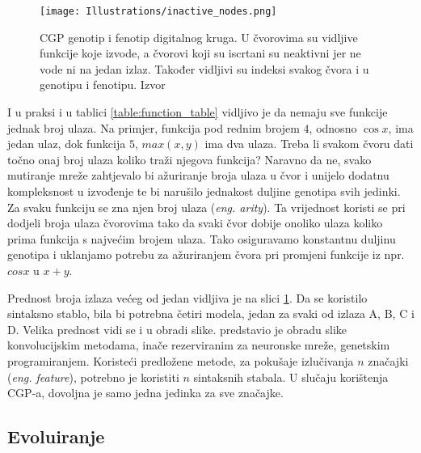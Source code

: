 \begin{figure}
	\centering
	\texttt{[image: Illustrations/inactive\_nodes.png]}
	\caption{CGP genotip i fenotip digitalnog kruga. U čvorovima su vidljive funkcije koje izvode, a čvorovi koji su iscrtani su neaktivni jer ne vode ni na jedan izlaz. Također vidljivi su indeksi svakog čvora i u genotipu i fenotipu. Izvor \cite{cgp}}
	\label{fig:cgp_gene_feno}
\end{figure}

I u praksi i u tablici \ref{table:function_table} vidljivo je da nemaju sve funkcije jednak broj ulaza.
Na primjer, funkcija pod rednim brojem $4$, odnosno $\cos{x}$, ima jedan ulaz, dok funkcija $5$, $max(x, y)$ ima dva ulaza.
Treba li svakom čvoru dati točno onaj broj ulaza koliko traži njegova funkcija?
Naravno da ne, svako mutiranje mreže zahtjevalo bi ažuriranje broja ulaza u čvor i unijelo dodatnu kompleksnost u izvođenje te bi narušilo jednakost duljine genotipa svih jedinki.
Za svaku funkciju se zna njen broj ulaza (\emph{eng. arity}).
Ta vrijednost koristi se pri dodjeli broja ulaza čvorovima tako da svaki čvor dobije onoliko ulaza koliko prima funkcija s najvećim brojem ulaza.
Tako osiguravamo konstantnu duljinu genotipa i uklanjamo potrebu za ažuriranjem čvora pri promjeni funkcije iz npr. $cos{x}$ u $x + y$.

Prednost broja izlaza većeg od jedan vidljiva je na slici \ref{fig:cgp_gene_feno}.
Da se koristilo sintaksno stablo, bila bi potrebna četiri modela, jedan za svaki od izlaza A, B, C i D.
Velika prednost vidi se i u obradi slike.
\cite{conv_gp} predstavio je obradu slike konvolucijskim metodama, inače rezerviranim za neuronske mreže, genetskim programiranjem.
Koristeći predložene metode, za pokušaje izlučivanja $n$ značajki (\emph{eng. feature}), potrebno je koristiti $n$ sintaksnih stabala.
U slučaju korištenja CGP-a, dovoljna je samo jedna jedinka za sve značajke.

\subsection{Evoluiranje}

